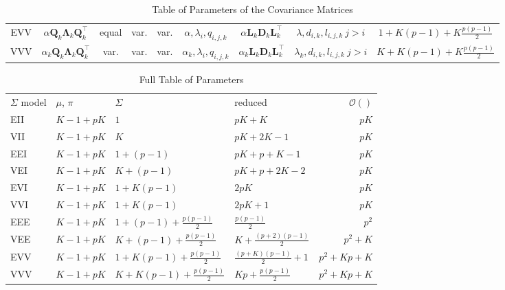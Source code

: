 \begin{table}[!htb]
{\begin{tabular}{| c | c c c c c | c c c |}
            \hline
            EVV    & $ \alpha \pmb{Q}_k \pmb{\Lambda}_k \pmb{Q}_k^\top $ & equal & var. & var. & $ \alpha, \lambda_{i}, q_{i,j,k} $ & $ \alpha \pmb{L}_k \pmb{D}_k \pmb{L}_k^\top $ & $ \lambda, d_{i,k}, l_{i,j,k}\ j>i $ & $ 1+K(p-1)+K\frac{p(p-1)}{2} $  \\
            VVV    & $ \alpha_k \pmb{Q}_k \pmb{\Lambda}_k \pmb{Q}_k^\top $ & var. & var. & var. & $ \alpha_k, \lambda_{i}, q_{i,j,k} $ & $ \alpha_k \pmb{L}_k \pmb{D}_k \pmb{L}_k^\top $ & $ \lambda_k, d_{i,k}, l_{i,j,k}\ j>i $ & $ K+K(p-1)+K\frac{p(p-1)}{2} $ \\
            \hline
        \end{tabular}
    }

    \caption{Table of Parameters of the Covariance Matrices}
    \label{table:paramSigma}
\end{table}

\clearpage

\begin{table}
    \centering
    \begin{tabular}{l|l l|l|r}
        $\Sigma$ model  & $\mu$, $\pi$  & $\Sigma$      & reduced       & $\mathcal{O}()$ \\
        EII        & $ K -1 + pK$  & $1$                        & $pK+K$                & $pK$ \\
        VII        & $ K -1 + pK$  & $K$                        & $pK+2K-1$             & $pK$ \\
        EEI        & $ K -1 + pK$  & $1+(p-1)$                  & $pK+p+K-1$            & $pK$ \\
        VEI        & $ K -1 + pK$  & $K+(p-1)$                  & $pK+p+2K-2$           & $pK$ \\
        EVI        & $ K -1 + pK$  & $1+K(p-1)$                 & $2pK$                 & $pK$ \\
        VVI        & $ K -1 + pK$  & $1+K(p-1)$                 & $2pK+1$               & $pK$ \\
        EEE        & $ K -1 + pK$  & $1+(p-1)+\frac{p(p-1)}{2}$ & $\frac{p(p-1)}{2}$    & $p^2$ \\
        VEE        & $ K -1 + pK$  & $K+(p-1)+\frac{p(p-1)}{2}$ & $K+\frac{(p+2)(p-1)}{2}$  & $p^2+K$ \\
        EVV        & $ K -1 + pK$  & $1+K(p-1)+\frac{p(p-1)}{2}$ & $\frac{(p+K)(p-1)}{2}+1$       & $p^2+Kp+K$ \\
        VVV        & $ K -1 + pK$  & $K+K(p-1)+\frac{p(p-1)}{2}$ & $Kp+\frac{p(p-1)}{2}$       & $p^2+Kp+K$ \\
    \end{tabular}
    \caption{Full Table of Parameters}
    \label{table:param}
\end{table}

